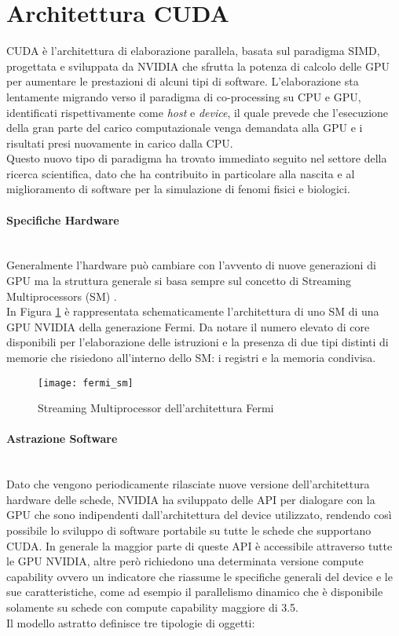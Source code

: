 \section{Architettura CUDA}

CUDA è l'architettura di elaborazione
parallela, basata sul paradigma SIMD,
progettata e sviluppata da NVIDIA che sfrutta la potenza di calcolo delle GPU
per aumentare le prestazioni di alcuni tipi di software.
L'elaborazione sta lentamente migrando verso il paradigma di 
co-processing su CPU e GPU, identificati rispettivamente come
\textit{host} e \textit{device}, il quale prevede che l'esecuzione della
gran parte del carico computazionale venga demandata alla GPU e i risultati
presi nuovamente in carico dalla CPU.
\\
Questo nuovo tipo di paradigma ha trovato immediato seguito nel settore
della ricerca scientifica, dato che ha contribuito in particolare alla nascita
e al miglioramento di software per la simulazione di fenomi fisici e
biologici.

\paragraph{Specifiche Hardware}\mbox{}
\\
Generalmente l'hardware può cambiare con l'avvento di
nuove generazioni di GPU ma la struttura generale si basa sempre sul concetto di
Streaming Multiprocessors (SM) \cite{nickolls2010gpu}.
\\
In Figura \ref{fig:fermi-arch} è rappresentata schematicamente l'architettura
di uno SM di una GPU NVIDIA della generazione Fermi. Da notare il
numero elevato di core disponibili per l'elaborazione delle istruzioni e la
presenza di due tipi distinti di memorie che risiedono all'interno dello SM:
i registri e la memoria condivisa.

\begin{figure}[t]
    \centering
    \texttt{[image: fermi\_sm]}
    \caption{Streaming Multiprocessor dell'architettura Fermi 
        \cite{nickolls2010gpu}}
    \label{fig:fermi-arch}
\end{figure}

\paragraph{Astrazione Software}\mbox{}
\\
Dato che vengono periodicamente rilasciate nuove versione dell'architettura
hardware delle schede, NVIDIA ha sviluppato delle API per dialogare con la GPU
che sono indipendenti dall'architettura del device utilizzato, rendendo
così possibile lo sviluppo di software portabile su tutte le schede che
supportano CUDA. In generale la maggior parte di queste API è accessibile
attraverso tutte le GPU NVIDIA, altre però richiedono una determinata versione
compute capability ovvero un indicatore che riassume le specifiche
generali del device e le sue caratteristiche, come ad esempio il parallelismo
dinamico che è disponibile solamente su schede con compute capability maggiore
di 3.5.
\\
Il modello astratto definisce tre tipologie di oggetti:

